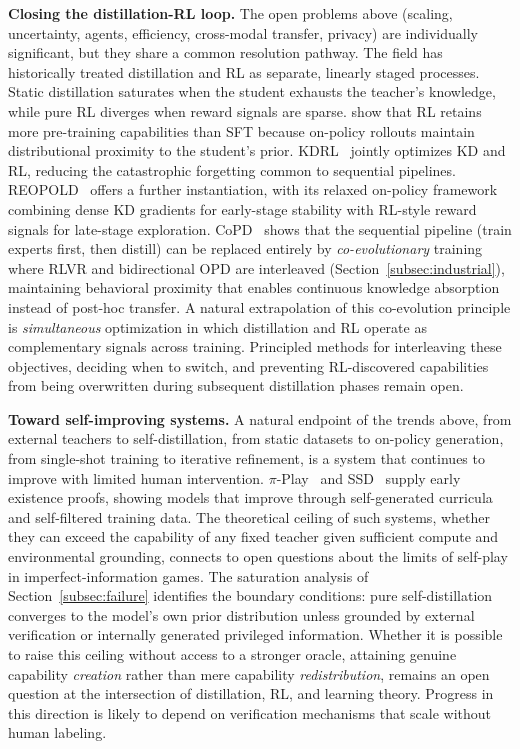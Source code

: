 \documentclass{article} %
\begin{document}
\textbf{Closing the distillation-RL loop.} The open problems above (scaling, uncertainty, agents, efficiency, cross-modal transfer, privacy) are individually significant, but they share a common resolution pathway. The field has historically treated distillation and RL as separate, linearly staged processes. Static distillation saturates when the student exhausts the teacher's knowledge, while pure RL diverges when reward signals are sparse. \citet{2510.18874} show that RL retains more pre-training capabilities than SFT because on-policy rollouts maintain distributional proximity to the student's prior. KDRL~\citep{2506.02208} jointly optimizes KD and RL, reducing the catastrophic forgetting common to sequential pipelines. REOPOLD~\citep{2603.11137} offers a further instantiation, with its relaxed on-policy framework combining dense KD gradients for early-stage stability with RL-style reward signals for late-stage exploration. CoPD~\citep{gu2026copd} shows that the sequential pipeline (train experts first, then distill) can be replaced entirely by \emph{co-evolutionary} training where RLVR and bidirectional OPD are interleaved (Section~\ref{subsec:industrial}), maintaining behavioral proximity that enables continuous knowledge absorption instead of post-hoc transfer. A natural extrapolation of this co-evolution principle is \emph{simultaneous} optimization in which distillation and RL operate as complementary signals across training. Principled methods for interleaving these objectives, deciding when to switch, and preventing RL-discovered capabilities from being overwritten during subsequent distillation phases remain open.

\textbf{Toward self-improving systems.} A natural endpoint of the trends above, from external teachers to self-distillation, from static datasets to on-policy generation, from single-shot training to iterative refinement, is a system that continues to improve with limited human intervention. $\pi$-Play~\citep{zhang2026piplay} and SSD~\citep{zhang2026embarrassingly} supply early existence proofs, showing models that improve through self-generated curricula and self-filtered training data. The theoretical ceiling of such systems, whether they can exceed the capability of any fixed teacher given sufficient compute and environmental grounding, connects to open questions about the limits of self-play in imperfect-information games. The saturation analysis of Section~\ref{subsec:failure} identifies the boundary conditions: pure self-distillation converges to the model's own prior distribution unless grounded by external verification or internally generated privileged information. Whether it is possible to raise this ceiling without access to a stronger oracle, attaining genuine capability \emph{creation} rather than mere capability \emph{redistribution}, remains an open question at the intersection of distillation, RL, and learning theory. Progress in this direction is likely to depend on verification mechanisms that scale without human labeling.
\end{document}
